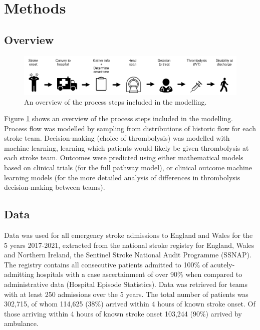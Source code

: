 \section{Methods}

\subsection{Overview}

\begin{figure}
    \centering
    \includegraphics[width=1.0\linewidth]{images/flow}
    \caption{An overview of the process steps included in the modelling.}
    \label{fig:flow}
\end{figure}

Figure \ref{fig:flow} shows an overview of the process steps included in the modelling. Process flow was modelled by sampling from distributions of historic flow for each stroke team. Decision-making (choice of thrombolysis) was modelled with machine learning, learning which patients would likely be given thrombolysis at each stroke team. Outcomes were predicted using either mathematical models based on clinical trials (for the full pathway model), or clinical outcome machine learning models (for the more detailed analysis of differences in thrombolysis decision-making between teams).

\subsection{Data}

Data was used for all emergency stroke admissions to England and Wales for the 5 years 2017-2021, extracted from the national stroke registry for England, Wales and Northern Ireland, the Sentinel Stroke National Audit Programme (SSNAP). The registry contains all consecutive patients admitted to 100\% of acutely-admitting hospitals with a case ascertainment of over 90\% when compared to administrative data (Hospital Episode Statistics). Data was retrieved for teams with at least 250 admissions over the 5 years. The total number of patients was 302,715, of whom 114,625 (38\%) arrived within 4 hours of known stroke onset. Of those arriving within 4 hours of known stroke onset 103,244 (90\%) arrived by ambulance.

